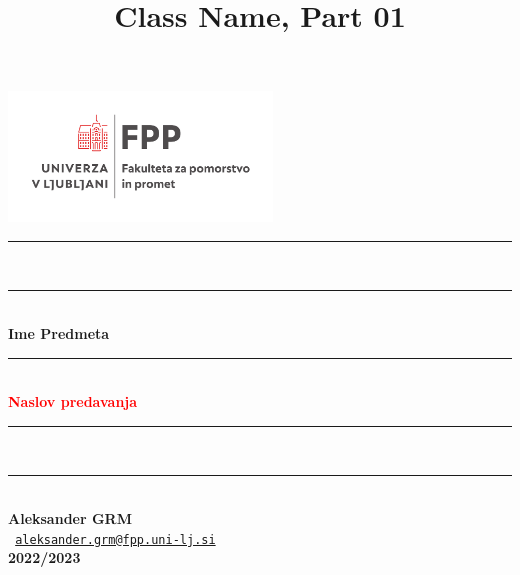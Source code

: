 \documentclass[8pt,aspectratio=169]{beamer} %
\title{Class Name, Part 01}
\author[A. GRM]{}
\begin{document}

\begin{frame}[plain,noframenumbering,label=titlepage]
	\begin{center}
		\includegraphics[width=7cm]{../fpp_logo_vertical.pdf}
		
		\hspace*{0mm}\rule{120mm}{1mm}\\
		\vspace*{-2mm}%
		\hspace*{0mm}\rule{120mm}{0.5mm}\\
		\vspace*{2.5mm}
		{\Huge \textbf{Ime Predmeta}}\\
		\vspace*{0.5mm}
		\hspace*{0mm}\rule{80mm}{0.5mm}\\
		\vspace{2mm}
		\large{\textbf{\textcolor{red}{Naslov predavanja}}}\\[2mm]
		\vspace*{-2mm}%
		\hspace*{0mm}\rule{120mm}{0.5mm}\\
		\vspace*{-1.5mm}%
		\hspace*{0mm}\rule{120mm}{1mm}\\
		\vspace*{5mm}
		\small{\textbf{Aleksander GRM}}\\[1mm]
		\footnotesize{\texttt{ \href{mailto:aleksander.grm@fpp.uni-lj.si}{aleksander.grm@fpp.uni-lj.si}}}\\[4mm]
		\small{\textbf{2022/2023}}
	\end{center}
\end{frame}

\end{document}
